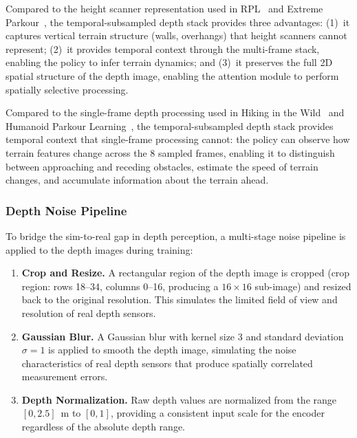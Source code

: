 Compared to the height scanner representation used in RPL~\cite{zhang2024rpl} and Extreme Parkour~\cite{cheng2024extremeparkour}, the temporal-subsampled depth stack provides three advantages: (1)~it captures vertical terrain structure (walls, overhangs) that height scanners cannot represent; (2)~it provides temporal context through the multi-frame stack, enabling the policy to infer terrain dynamics; and (3)~it preserves the full 2D spatial structure of the depth image, enabling the attention module to perform spatially selective processing.

Compared to the single-frame depth processing used in Hiking in the Wild~\cite{zhu2024hiking} and Humanoid Parkour Learning~\cite{zhuang2024humanoidparkour}, the temporal-subsampled depth stack provides temporal context that single-frame processing cannot: the policy can observe how terrain features change across the 8 sampled frames, enabling it to distinguish between approaching and receding obstacles, estimate the speed of terrain changes, and accumulate information about the terrain ahead.

\subsubsection{Depth Noise Pipeline}

To bridge the sim-to-real gap in depth perception, a multi-stage noise pipeline is applied to the depth images during training:

\begin{enumerate}
    \item \textbf{Crop and Resize.} A rectangular region of the depth image is cropped (crop region: rows 18--34, columns 0--16, producing a $16 \times 16$ sub-image) and resized back to the original resolution. This simulates the limited field of view and resolution of real depth sensors.

    \item \textbf{Gaussian Blur.} A Gaussian blur with kernel size 3 and standard deviation $\sigma=1$ is applied to smooth the depth image, simulating the noise characteristics of real depth sensors that produce spatially correlated measurement errors.

    \item \textbf{Depth Normalization.} Raw depth values are normalized from the range $[0, 2.5]$~m to $[0, 1]$, providing a consistent input scale for the encoder regardless of the absolute depth range.
\end{enumerate}

